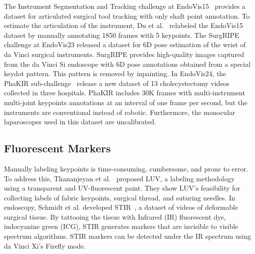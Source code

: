 The Instrument Segmentation and Tracking challenge at EndoVis15~\cite{bodenstedt2018comparative} provides a dataset for articulated surgical tool tracking with only shaft point annotation.  To estimate the articulation of the instrument, Du et al.~\cite{du2018articulated} relabeled the EndoVis15 dataset by manually annotating 1850 frames with 5 keypoints. The SurgRIPE~\cite{surgripe2024xu} challenge at EndoVis23 released a dataset for 6D pose estimation of the wrist of da Vinci surgical instruments. SurgRIPE provides high-quality images captured from the da Vinci Si endoscope with 6D pose annotations obtained from a special keydot pattern. This pattern is removed by inpainting. In EndoVis24, the PhaKIR sub-challenge~\cite{phakir2024rueckert} release a new dataset of 13 cholecystectomy videos collected in three hospitals. PhaKIR includes 30K frames with multi-instrument multi-joint keypoints annotations at an interval of one frame per second, but the instruments are conventional instead of robotic. Furthermore, the monocular laparoscopes used in this dataset are uncalibrated. 

\subsection{Fluorescent Markers}
Manually labeling keypoints is time-consuming, cumbersome, and prone to error. To address this, Thananjeyan et al.~\cite{thananjeyan2022all} proposed LUV, a labeling methodology using a transparent and UV-fluorescent paint. They show LUV's feasibility for collecting labels of fabric keypoints, surgical thread, and suturing needles. In endoscopy, Schmidt et al. developed STIR~\cite{schmidt2024surgical}, a dataset of videos of deformable surgical tissue. By tattooing the tissue with Infrared (IR) fluorescent dye, indocyanine green (ICG), STIR generates markers that are invisible to visible spectrum algorithms. STIR markers can be detected under the IR spectrum using da Vinci Xi's Firefly mode.